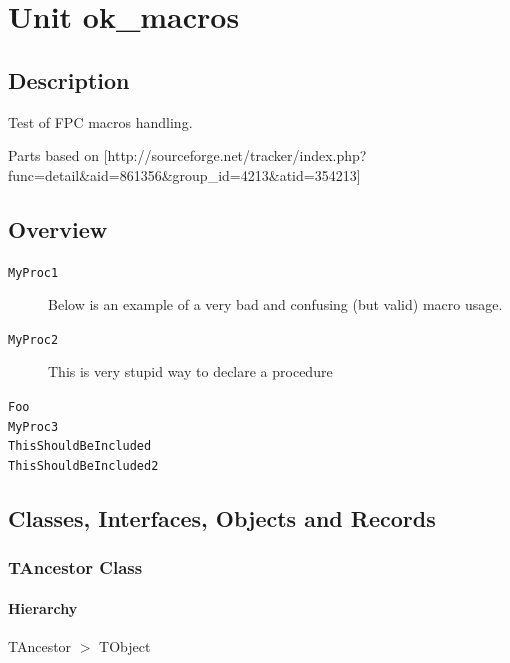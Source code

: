 \documentclass{report}
\begin{document}
\newlength{\tmplength}
\chapter{Unit ok{\_}macros}
\section{Description}
Test of FPC macros handling.\hfill\vspace*{1ex}



Parts based on [http://sourceforge.net/tracker/index.php?func=detail{\&}aid=861356{\&}group{\_}id=4213{\&}atid=354213]
\section{Overview}
\begin{description}
\item[\texttt{\begin{ttfamily}TAncestor\end{ttfamily} Class}]
\item[\texttt{\begin{ttfamily}TMyClass\end{ttfamily} Class}]
\end{description}
\begin{description}
\item[\texttt{MyProc1}]Below is an example of a very bad and confusing (but valid) macro usage.
\item[\texttt{MyProc2}]This is very stupid way to declare a procedure
\item[\texttt{Foo}]
\item[\texttt{MyProc3}]
\item[\texttt{ThisShouldBeIncluded}]
\item[\texttt{ThisShouldBeIncluded2}]
\end{description}
\section{Classes, Interfaces, Objects and Records}
\subsection*{TAncestor Class}
\subsubsection*{\large{\textbf{Hierarchy}}\normalsize\hspace{1ex}\hfill}
TAncestor {$>$} TObject
\end{document}
